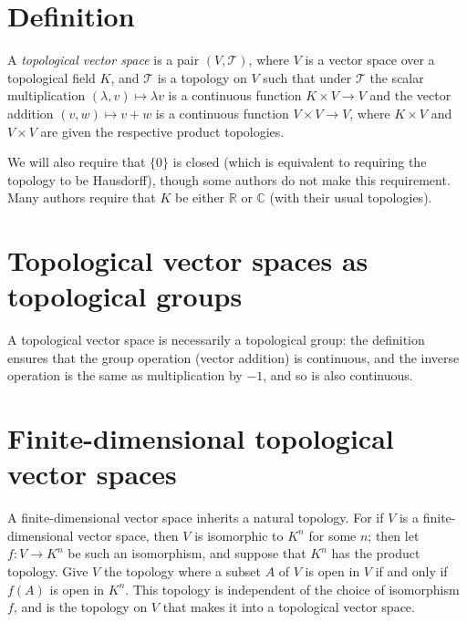 \documentclass{article}
\def\R{\mathbb{R}}
\def\C{\mathbb{C}}
\begin{document}

\section*{Definition}

A \emph{topological vector space} is a pair $(V,\mathcal{T})$,
where $V$ is a vector space over a topological field $K$,
and $\mathcal{T}$ is a topology on $V$ such that under $\mathcal{T}$
the scalar multiplication $(\lambda,v)\mapsto\lambda v$
is a continuous function $K\times V\to V$
and the vector addition $(v,w)\mapsto v+w$
is a continuous function $V\times V\to V$,
where $K\times V$ and $V\times V$ are given the respective product topologies.

We will also require that $\{0\}$ is closed
(which is equivalent to requiring the topology to be Hausdorff),
though some authors do not make this requirement.
Many authors require that $K$ be either $\R$ or $\C$
(with their usual topologies).

\section*{Topological vector spaces as topological groups}

A topological vector space is necessarily a topological group:
the definition ensures that the group operation (vector addition) is continuous,
and the inverse operation is the same as multiplication by $-1$,
and so is also continuous.

\section*{Finite-dimensional topological vector spaces}

A finite-dimensional vector space inherits a natural topology.
For if $V$ is a finite-dimensional vector space,
then $V$ is isomorphic to $K^n$ for some $n$;
then let $f\colon V\to K^n$ be such an isomorphism,
and suppose that $K^n$ has the product topology.
Give $V$ the topology where a subset $A$ of $V$ is open in $V$
if and only if $f(A)$ is open in $K^n$.
This topology is independent of the choice of isomorphism $f$,
and is the  topology on $V$
that makes it into a topological vector space.
\end{document}
